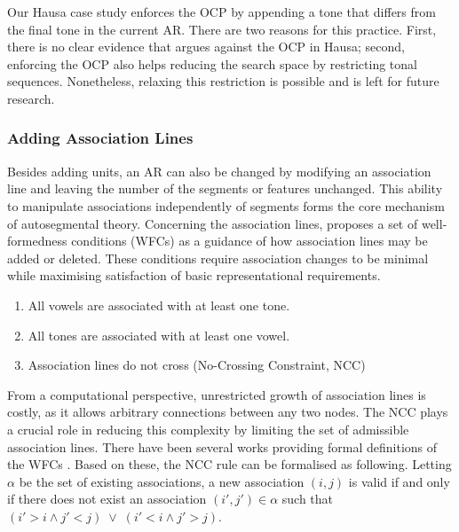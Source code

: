 Our Hausa case study enforces the OCP by 
appending a tone that differs from the final 
tone in the current AR. There are two reasons for this practice. First, there is no clear evidence 
that argues against the OCP in Hausa; second, enforcing the OCP also 
helps reducing the search space by restricting tonal sequences. 
Nonetheless, relaxing this restriction is possible and is left 
for future research.


\subsubsection{Adding Association Lines}
Besides adding units, an AR can also be changed by modifying an 
association line and leaving the number of the segments or features 
unchanged. This ability to manipulate associations independently 
of segments forms the core mechanism of autosegmental theory. 
Concerning the association lines, \citet{goldsmith1976autosegmental} 
proposes a set of well-formedness conditions (WFCs) as a guidance 
of how association lines may be added or deleted. These conditions 
require association changes to be minimal while maximising satisfaction 
of basic representational requirements.

\begin{enumerate}
	\setlength\itemsep{0em}
	\setlength\parskip{0em}
	\item All vowels are associated with at least one tone.
	\item All tones are associated with at least one vowel.
	\item Association lines do not cross (No-Crossing Constraint, NCC)
\end{enumerate}

From a computational perspective, unrestricted growth of association lines is costly, as it allows arbitrary connections between any two nodes.
The NCC plays a crucial role in reducing this complexity by limiting the 
set of admissible association lines. There have been several works 
providing formal definitions of the WFCs \citep{goldsmith1976autosegmental, 
	coleman1991no, jardine2015concatenation, jardine2017LocalNature}. 
Based on these, the NCC rule can be formalised as following. Letting \(\alpha\) be the set of existing associations, a new association \((i,j)\) is valid if 
and only if there does not exist an association \((i',j') \in \alpha\) such 
that \( (i' > i \wedge j' < j) \;\vee\; (i' < i \wedge j' > j)\). 

